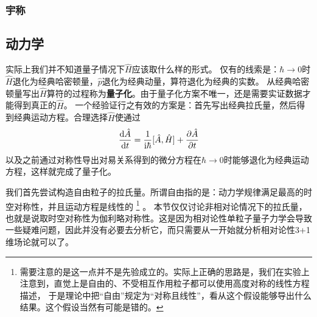 \documentclass[hyperref, UTF8, a4paper]{ctexart}
\newcommand*{\ii}{\mathrm{i}}
\begin{document}
\subsubsection{宇称}


\subsection{动力学}

实际上我们并不知道量子情况下$\hat{H}$应该取什么样的形式。
仅有的线索是：$\hbar \to 0$时$\hat{H}$退化为经典哈密顿量，$\hat{p}$退化为经典动量，算符退化为经典的实数。
从经典哈密顿量写出$\hat{H}$算符的过程称为\textbf{量子化}。由于量子化方案不唯一，还是需要实证数据才能得到真正的$\hat{H}$。
一个经验证行之有效的方案是：首先写出经典拉氏量，然后得到经典运动方程。合理选择$\hat{H}$使通过
\begin{equation}
    \dv{\hat{A}}{t} = \frac{1}{\ii \hbar} [\hat{A}, \hat{H}] + \pdv{\hat{A}}{t}
\end{equation}
以及之前通过对称性导出对易关系得到的微分方程在$\hbar \to 0$时能够退化为经典运动方程，这样就完成了量子化。

我们首先尝试构造自由粒子的拉氏量。所谓自由指的是：动力学规律满足最高的时空对称性，并且运动方程是线性的%
\footnote{
    需要注意的是这一点并不是先验成立的。实际上正确的思路是，我们在实验上注意到，直觉上是自由的、不受相互作用粒子都可以使用高度对称的线性方程描述，
    于是理论中把“自由”规定为“对称且线性”，看从这个假设能够导出什么结果。这个假设当然有可能是错的。
}%
。
本节仅仅讨论非相对论情况下的拉氏量，也就是说取时空对称性为伽利略对称性。这是因为相对论性单粒子量子力学会导致一些疑难问题，因此并没有必要去分析它，而只需要从一开始就分析相对论性3+1维场论就可以了。
\end{document}
